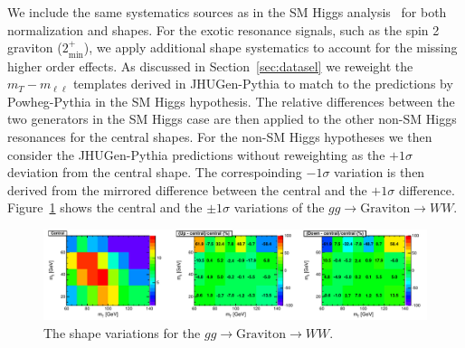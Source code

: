 We include the same systematics sources as in the 
SM Higgs analysis~\cite{HWWHCP2012} for both normalization and shapes. 
For the exotic resonance signals, such as the spin 2 
graviton ($2_\text{min}^+$), we apply additional 
shape systematics to account for the missing higher order effects. 
As discussed in Section~\ref{sec:datasel} we reweight the $m_T-m_{\ell\ell}$ templates 
derived in JHUGen-Pythia to match to the predictions by Powheg-Pythia in the SM Higgs hypothesis. 
The relative differences between the two generators in the SM Higgs case 
are then applied to the other non-SM Higgs resonances for the central shapes. 
For the non-SM Higgs hypotheses we then consider the JHUGen-Pythia 
predictions without reweighting as the $+1\sigma$ deviation from the central shape. 
The correspoinding $-1\sigma$ variation is then derived from the mirrored difference between 
the central and the $+1\sigma$ difference. 
Figure~\ref{fig:xwwshapevar} shows the central and the $\pm1\sigma$ variations 
of the $gg\to \text{Graviton}\to WW$. 

\begin{figure}[!hbtp]
\centering
\label{subfig:xwwshapevar}
\includegraphics[width=1.05\textwidth]{figures/xww_ggHshapevar.pdf}
\caption{The shape variations for the $gg\to \text{Graviton}\to WW$. 
}
\label{fig:xwwshapevar}
\end{figure}
